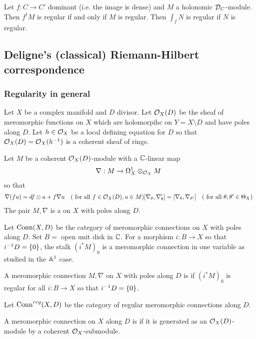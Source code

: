 \begin{lemma}
	Let $f:C\to C'$ dominant (i.e. the image is dense) and $M$ a holonomic ${\mathcal{D}}_C$-module.
	Then $f^\dagger M$ is regular if and only if $M$ is regular.
	Then $\int_f N$ is regular if $N$ is regular.
\end{lemma}


\subsection{Deligne's (classical) Riemann-Hilbert correspondence}
\subsubsection{Regularity in general}
Let $X$ be a complex manifold and $D$ divisor. Let ${\mathcal{O}}_X(D)$ be the sheaf of meromorphic functions
on $X$ which are holomorpihc on $Y = X\setminus D$ and have poles along $D$.
Let $h\in {\mathcal{O}}_X$ be a local defining equation for $D$ so that ${\mathcal{O}}_X(D) = {\mathcal{O}}_X(h^{-1})$
is a coherent sheaf of rings.

\begin{definition}
	Let $M$ be a coherent ${\mathcal{O}}_X(D)$-module with a $\mathbb{C}$-linear map \begin{align*}
		\nabla: M\to \Omega^1_X\otimes_{{\mathcal{O}}_X} M
	\end{align*} so that \begin{align*}
		\nabla(fu) = df\otimes u + f\nabla u \quad (\text{ for all } f\in {\mathcal{O}}_X(D), u\in M)
		[\nabla_\theta, \nabla_\theta'] = [\nabla_\theta, \nabla_{\theta'}] \quad (\text{ for all } \theta,\theta'\in \Theta_X)
	\end{align*}
	The pair $M,\nabla$ is a  on $X$ with poles along $D$.
\end{definition}
Let $\operatorname{Conn}(X,D)$ be the category of meromorphic connections on $X$ with poles along $D$.
Set $B = $ open unit disk in $\mathbb{C}$. For a morphism $i:B\to X$ so that $i^{-1}D = \{0\}$,
the stalk $(i^*M)_0$ is a meromorphic connection in one variable as studied in the $\mathbb{A}^1$ case.

\begin{definition}
	A meromorphic connection $M,\nabla$ on $X$ with poles along $D$ is  if
	$(i^*M)_0$ is regular for all $i:B\to X$ so that $i^{-1}D = \{0\}$.
\end{definition}
Let $\operatorname{Conn}^{reg}(X,D)$ be the category of regular meromorphic connections along $D$.

\begin{definition}
	A meromorphic connection on $X$ along $D$ is 
	if it is generated as an ${\mathcal{O}}_X(D)$-module by a coherent ${\mathcal{O}}_X$-submodule.
\end{definition}

